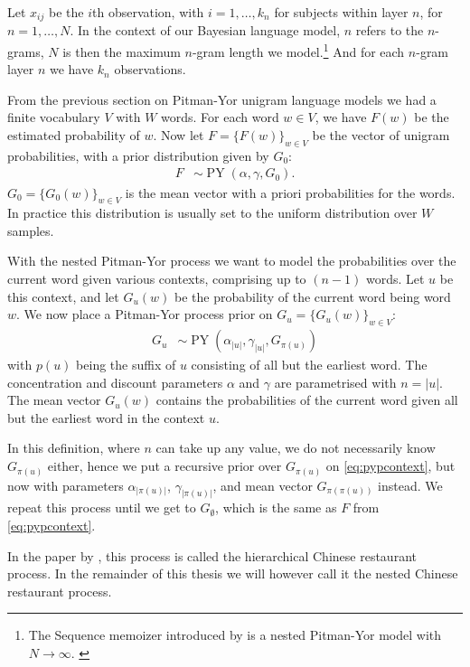 Let $x_{ij}$ be the $i$th observation, with $i = 1,\ldots,k_n$ for subjects within layer $n$, for $n=1,\ldots,N$. In the context of our Bayesian language model, $n$ refers to the $n$-grams, $N$ is then the maximum $n$-gram length we model.\footnote[][-3em]{The Sequence memoizer introduced by \citet{Wood2009A} is a nested Pitman-Yor model with $N\rightarrow\infty$. \cite{Wood2009A}} And for each $n$-gram layer $n$ we have $k_n$ observations.

From the previous section on Pitman-Yor unigram language models we had a finite vocabulary $V$ with $W$ words. For each word $w\in V$, we have $F(w)$ be the estimated probability of $w$. Now let $F=\{F(w)\}_{w\in V}$ be the vector of unigram probabilities, with a prior distribution given by $G_0$: 
\begin{align}\label{eq:pypcontext}
	F&\sim\operatorname{PY}(\alpha, \gamma, G_0).
\end{align}
$G_0=\{G_0(w)\}_{w\in V}$ is the mean vector with a priori probabilities for the words. In practice this distribution is usually set to the uniform distribution over $W$ samples. 

With the nested Pitman-Yor process we want to model the probabilities over the current word given various contexts, comprising up to $(n-1)$ words. Let $u$ be this context, and let $G_u(w)$ be the probability of the current word being word $w$. We now place a Pitman-Yor process prior on $G_u = \{G_u(w)\}_{w\in V}$:
\begin{align}\label{eq:npypcontext}
	G_u&\sim\operatorname{PY}(\alpha_{|u|},\gamma_{|u|},G_{\pi(u)})
\end{align}
with $p(u)$ being the suffix of $u$ consisting of all but the earliest word. The concentration and discount parameters $\alpha$ and $\gamma$ are parametrised with $n = |u|$. The mean vector $G_u(w)$ contains the probabilities of the current word given all but the earliest word in the context $u$.

In this definition, where $n$ can take up any value, we do not necessarily know $G_{\pi(u)}$ either, hence we put a recursive prior over $G_{\pi(u)}$ on \cref{eq:pypcontext}, but now with parameters $\alpha_{|\pi(u)|}$, $\gamma_{|\pi(u)|}$, and mean vector $G_{\pi(\pi(u))}$ instead. We repeat this process until we get to $G_\emptyset$, which is the same as $F$ from \cref{eq:pypcontext}.

In the paper by \textcite{Teh2006ATechnical}, this process is called the hierarchical Chinese restaurant process. In the remainder of this thesis we will however call it the nested Chinese restaurant process. 

